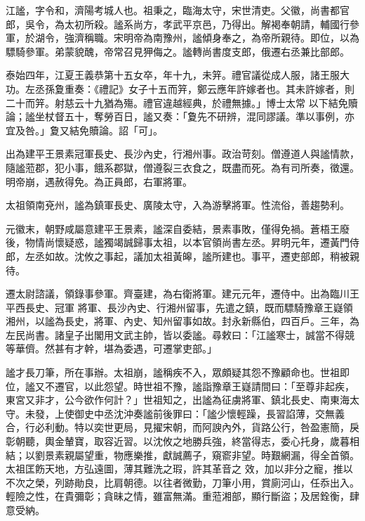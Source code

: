 
\begin{pinyinscope}

 江謐，字令和，濟陽考城人也。祖秉之，臨海太守，宋世清吏。父徽，尚書都官郎，吳令，為太初所殺。謐系尚方，孝武平京邑，乃得出。解褐奉朝請，輔國行參軍，於湖令，強濟稱職。宋明帝為南豫州，謐傾身奉之，為帝所親待。即位，以為驃騎參軍。弟蒙貌醜，帝常召見狎侮之。謐轉尚書度支郎，俄遷右丞兼比部郎。



 泰始四年，江夏王義恭第十五女卒，年十九，未笄。禮官議從成人服，諸王服大功。左丞孫夐重奏：《禮記》女子十五而笄，鄭云應年許嫁者也。其未許嫁者，則二十而笄。射慈云十九猶為殤。禮官違越經典，於禮無據。」博士太常
 以下結免贖論；謐坐杖督五十，奪勞百日，謐又奏：「夐先不研辨，混同謬議。準以事例，亦宜及咎。」夐又結免贖論。詔「可」。



 出為建平王景素冠軍長史、長沙內史，行湘州事。政治苛刻。僧遵道人與謐情款，隨謐蒞郡，犯小事，餓系郡獄，僧遵裂三衣食之，既盡而死。為有司所奏，徵還。明帝崩，遇赦得免。為正員郎，右軍將軍。



 太祖領南兗州，謐為鎮軍長史、廣陵太守，入為游擊將軍。性流俗，善趨勢利。



 元徽末，朝野咸屬意建平王景素，謐深自委結，景素事敗，僅得免禍。蒼梧王廢後，物情尚懷疑惑，謐獨竭誠歸事太祖，以本官領尚書左丞。昇明元年，遷黃門侍郎，左丞如故。沈攸之事起，議加太祖黃皞，謐所建也。事平，遷吏部郎，稍被親待。



 遷太尉諮議，領錄事參軍。齊臺建，為右衛將軍。建元元年，遷侍中。出為臨川王平西長史、冠軍
 將軍、長沙內史、行湘州留事，先遣之鎮，既而驃騎豫章王嶷領湘州，以謐為長史，將軍、內史、知州留事如故。封永新縣伯，四百戶。三年，為左民尚書。諸皇子出閣用文武主帥，皆以委謐。尋敕曰：「江謐寒士，誠當不得競等華儕。然甚有才幹，堪為委遇，可遷掌吏部。」



 謐才長刀筆，所在事辦。太祖崩，謐稱疾不入，眾頗疑其怨不豫顧命也。世祖即位，謐又不遷官，以此怨望。時世祖不豫，謐詣豫章王嶷請間曰：「至尊非起疾，東宮又非才，公今欲作何計？」世祖知之，出謐為征虜將軍、鎮北長史、南東海太守。未發，上使御史中丞沈沖奏謐前後罪曰：「謐少懷輕躁，長習諂薄，交無義合，行必利動。特以奕世更局，見擢宋朝，而阿諛內外，貨路公行，咎盈憲簡，戾彰朝聽，輿金輦寶，取容近習。以沈攸之地勝兵強，終當得志，委心托身，歲暮相結；以劉景素親屬望重，物應樂推，獻誠薦子，窺窬非望。時艱網漏，得全首領。太祖匡飭天地，方弘遠圖，薄其難洗之瑕，許其革音之
 效，加以非分之寵，推以不次之榮，列跡勛良，比肩朝德。以往者微勤，刀筆小用，賞廁河山，任忝出入。輕險之性，在貴彌彰；貪昧之情，雖富無滿。重蒞湘部，顯行斷盜；及居銓衡，肆意受納。




\end{pinyinscope}
